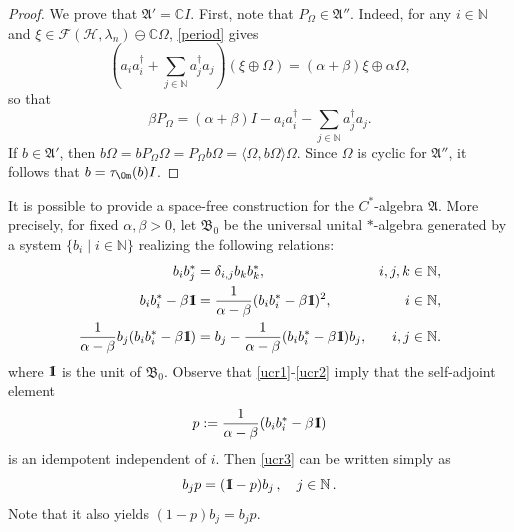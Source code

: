 \documentclass[12pt]{amsart}
\numberwithin{equation}{section}
\def\cf{{\mathcal F}}
\def\ch{{\mathcal H}}
\def\ga{{\mathfrak A}} \def\gpa{{\mathfrak a}}
\def\gb{{\mathfrak B}}\def\gpb{{\mathfrak b}}
\def\bc{{\mathbb C}}
\def\bn{{\mathbb N}}
\def\a{\alpha}
\def\b{\beta}
\def\d{\delta}  \def\D{\Delta}
\def\l{\lambda} \def\L{\Lambda}
\def\t{\tau}
\theoremstyle{definition}
\def\idd{{1}\!\!{\rm I}}
\begin{document}
\begin{proof}
We prove that $\ga' = \bc I$. First, note that $P_\Omega \in \ga''$. Indeed, for any $i \in \bn$ and $\xi \in \cf(\ch,\l_n) \ominus \bc \Omega$, \eqref{period} gives
\[
\left(a_i a_i^\dag + \sum_{j \in \bn} a_j^\dag a_j \right) (\xi \oplus \Omega) = (\a + \b) \xi \oplus \a \Omega,
\]
so that
\[
\b P_\Omega = (\a + \b) I - a_i a_i^\dag - \sum_{j \in \bn} a_j^\dag a_j.
\]
If $b \in \ga'$, then $b \Omega = b P_\Omega \Omega = P_\Omega b \Omega = \langle \Omega, b \Omega \rangle \Omega$. Since $\Omega$ is cyclic for $\ga''$, it follows that $b = \t_\Om(b) I$.
\end{proof}
It is possible to provide a space-free construction for the $C^*$-algebra $\ga$. More precisely, for fixed $\a,\b>0$, let $\gb_0$ be the universal unital $*$-algebra generated by a system $\{b_i \mid i \in \bn\}$ realizing the following relations:
\begin{align}
\label{ucr1} b_i b_j^* &= \d_{i,j} b_k b_k^*, & i,j,k \in \bn,\\
\label{ucr2} b_i b_i^* - \b \idd &= \frac{1}{\a-\b} (b_i b_i^* - \b \idd)^2, & i \in \bn,\\
\label{ucr3} \frac{1}{\a-\b} b_j (b_i b_i^* - \b \idd) &= b_j - \frac{1}{\a-\b} (b_i b_i^* - \b \idd) b_j, & i,j \in \bn.
\end{align}
where $\idd$ is the unit of $\gb_0$.
Observe that \eqref{ucr1}-\eqref{ucr2} imply that the self-adjoint element
\begin{equation}\label{pfree}
p := \frac{1}{\a-\b} (b_i b_i^* - \b \idd)
\end{equation}
is an idempotent independent of $i$. Then \eqref{ucr3} can be written simply as
\begin{equation}\label{pfree2}
b_j p = (\idd - p) b_j\,, \quad j \in \bn\,.
\end{equation}
Note that it also yields $(1-p)b_j=b_jp$.
\end{document}
